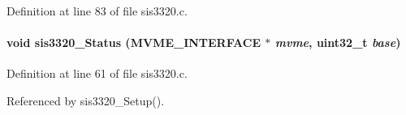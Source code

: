 Definition at line 83 of file sis3320.c.
\paragraph[{sis3320\_\-Status}]{\setlength{\rightskip}{0pt plus 5cm}void sis3320\_\-Status ({\bf MVME\_\-INTERFACE} $\ast$ {\em mvme}, \/  uint32\_\-t {\em base})}\hfill\label{sis3320_8c_a6c94c043d907f9fc1dc9f244ee50a498}


Definition at line 61 of file sis3320.c.

Referenced by sis3320\_\-Setup().